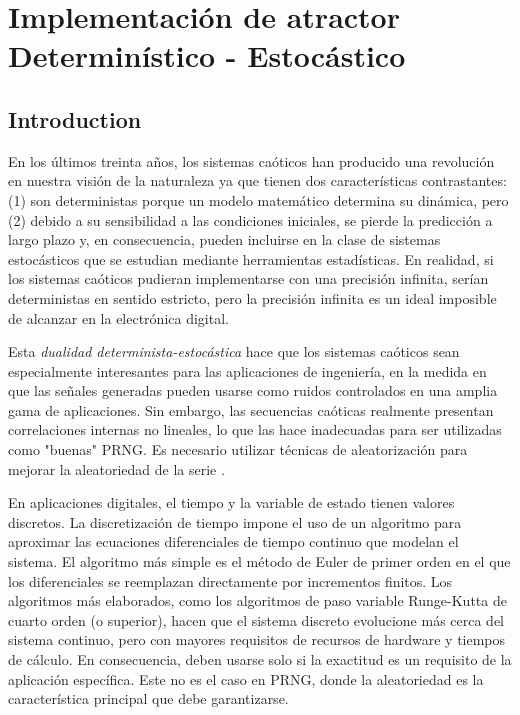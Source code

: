 \section{Implementación de atractor Determinístico - Estocástico}

\subsection{Introduction}

En los últimos treinta años, los sistemas caóticos han producido una revolución en nuestra visión de la naturaleza ya que tienen dos características contrastantes:
(1) son deterministas porque un modelo matemático determina su dinámica, pero
(2) debido a su sensibilidad a las condiciones iniciales, se pierde la predicción a largo plazo y, en consecuencia, pueden incluirse en la clase de sistemas estocásticos que se estudian mediante herramientas estadísticas.
En realidad, si los sistemas caóticos pudieran implementarse con una precisión infinita, serían deterministas en sentido estricto, pero la precisión infinita es un ideal imposible de alcanzar en la electrónica digital.

Esta \emph{dualidad determinista-estocástica} hace que los sistemas caóticos sean especialmente interesantes para las aplicaciones de ingeniería, en la medida en que las señales generadas pueden usarse como ruidos controlados en una amplia gama de aplicaciones.
Sin embargo, las secuencias caóticas realmente presentan correlaciones internas no lineales, lo que las hace inadecuadas para ser utilizadas como "buenas" PRNG.
Es necesario utilizar técnicas de aleatorización para mejorar la aleatoriedad de la serie \cite{DeMicco2008}.

En aplicaciones digitales, el tiempo y la variable de estado tienen valores discretos.
La discretización de tiempo impone el uso de un algoritmo para aproximar las ecuaciones diferenciales de tiempo continuo que modelan el sistema.
El algoritmo más simple es el método de Euler de primer orden en el que los diferenciales se reemplazan directamente por incrementos finitos.
Los algoritmos más elaborados, como los algoritmos de paso variable Runge-Kutta de cuarto orden (o superior), hacen que el sistema discreto evolucione más cerca del sistema continuo, pero con mayores requisitos de recursos de hardware y tiempos de cálculo.
En consecuencia, deben usarse solo si la exactitud es un requisito de la aplicación específica.
Este no es el caso en PRNG, donde la aleatoriedad es la característica principal que debe garantizarse.

